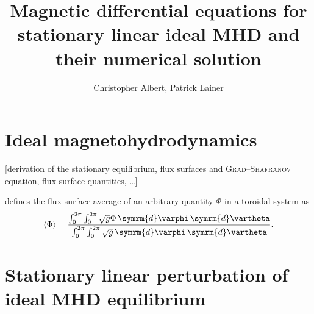 \documentclass[a4paper, twoside, 10pt, english]{article}
\title{Magnetic differential equations for stationary linear ideal MHD and their numerical solution}
\author{Christopher Albert, Patrick Lainer}
\numberwithin{equation}{section}
\let\temp\varrho
\let\varrho\rho
\let\rho\temp
\let\temp\vartheta
\let\vartheta\theta
\let\theta\temp
\let\temp\varphi
\let\varphi\phi
\let\phi\temp
\newcommand*\diff{\ensuremath{\symrm{d}}}  %
\begin{document}
\maketitle
\tableofcontents

\newpage
\section{Ideal magnetohydrodynamics}

[derivation of the stationary equilibrium, flux surfaces and \textsc{Grad}--\textsc{Shafranov} equation, flux surface quantities, \ldots]

\textcite{dHaeseleer91} defines the flux-surface average of an arbitrary quantity $\Phi$ in a toroidal system as
\begin{gather}
  \langle \Phi \rangle = \frac{\int_{0}^{2 \pi} \int_{0}^{2 \pi} \sqrt{g} \Phi \, \diff \phi \, \diff \theta}{\int_{0}^{2 \pi} \int_{0}^{2 \pi} \sqrt{g} \, \diff \phi \, \diff \theta}. \label{eq:flux_surface_avg}
\end{gather}

\clearpage
\section{Stationary linear perturbation of ideal MHD equilibrium}
\end{document}
